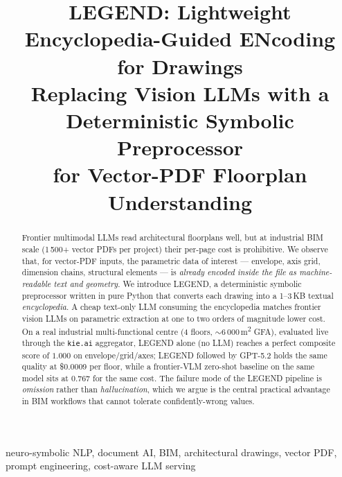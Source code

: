 \documentclass[conference]{IEEEtran}
\begin{document}
\title{LEGEND: Lightweight Encyclopedia-Guided ENcoding\\ for Drawings\\
\large Replacing Vision LLMs with a Deterministic Symbolic Preprocessor\\
       for Vector-PDF Floorplan Understanding}

\author{
}

\maketitle

\begin{abstract}
Frontier multimodal LLMs read architectural floorplans well, but at industrial
BIM scale (1\,500+ vector PDFs per project) their per-page cost is
prohibitive. We observe that, for vector-PDF inputs, the parametric data of
interest --- envelope, axis grid, dimension chains, structural elements ---
is \emph{already encoded inside the file as machine-readable text and
geometry}. We introduce LEGEND, a deterministic symbolic preprocessor written
in pure Python that converts each drawing into a 1--3\,KB textual
\emph{encyclopedia}. A cheap text-only LLM consuming the encyclopedia matches
frontier vision LLMs on parametric extraction at one to two orders of
magnitude lower cost. On a real industrial multi-functional centre (4 floors,
$\sim 6\,000$\,m\textsuperscript{2} GFA), evaluated live through the
\texttt{kie.ai} aggregator, LEGEND alone (no LLM) reaches a perfect composite
score of $1.000$ on envelope/grid/axes; LEGEND followed by GPT-5.2 holds the
same quality at \$0.0009 per floor, while a frontier-VLM zero-shot baseline
on the same model sits at $0.767$ for the same cost. The failure mode of the
LEGEND pipeline is \emph{omission} rather than \emph{hallucination}, which
we argue is the central practical advantage in BIM workflows that cannot
tolerate confidently-wrong values.
\end{abstract}

\begin{IEEEkeywords}
neuro-symbolic NLP, document AI, BIM, architectural drawings, vector PDF,
prompt engineering, cost-aware LLM serving
\end{IEEEkeywords}
\end{document}
